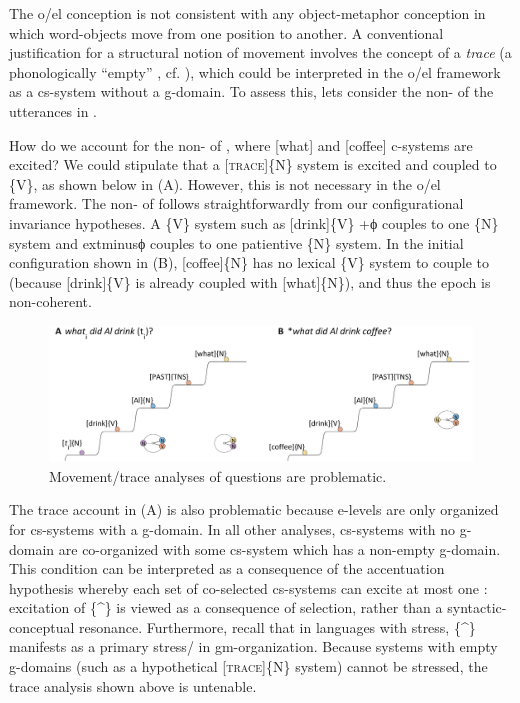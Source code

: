    The o/el conception is not consistent with any object-metaphor conception in which word-objects move from one position to another. A conventional justification for a structural notion of movement involves the concept of a \textit{trace} (a phonologically “empty” , cf. \citealt{Chomsky1965}), which could be interpreted in the o/el framework as a cs-system without a g-domain. To assess this, lets consider the non- of the utterances in .

\ea\label{ex:7:19}
  \label{ex:7:19a}
  \label{ex:7:19b}
\z
\z

  How do we account for the non- of , where [what] and [coffee] c-systems are excited?  We could stipulate that a [\textsc{trace}]\{N\} system is excited and coupled to \{V\}, as shown below in {}(A). However, this is not necessary in the o/el framework. The non- of  follows straightforwardly from our configurational invariance hypotheses. A  \{V\} system such as [drink]\{V\} +ϕ couples to one  \{N\} system and 	extminus{}ϕ couples to one patientive \{N\} system. In the initial configuration shown in {}(B), [coffee]\{N\} has no lexical \{V\} system to couple to (because [drink]\{V\} is already coupled with [what]\{N\}), and thus the epoch is non-coherent.

  
\begin{figure}
\includegraphics[width=\textwidth]{figures/Tilsen-img161.png}
\caption{Movement/trace analyses of questions are problematic.}
\label{fig:7:17}
\end{figure}
 

  The trace account in {}(A) is also problematic because e-levels are only organized for cs-systems with a g-domain. In all other analyses, cs-systems with no g-domain are co-organized with some cs-system which has a non-empty g-domain. This condition can be interpreted as a consequence of the accentuation hypothesis whereby each set of co-selected cs-systems can excite at most one : excitation of \{\^{}\} is viewed as a consequence of selection, rather than a syntactic-conceptual resonance. Furthermore, recall that in languages with stress, \{\^{}\} manifests as a primary stress/ in gm-or\-ga\-ni\-za\-tion. Because systems with empty g-domains (such as a hypothetical [\textsc{trace}]\{N\} system) cannot be stressed, the trace analysis shown above is untenable.

